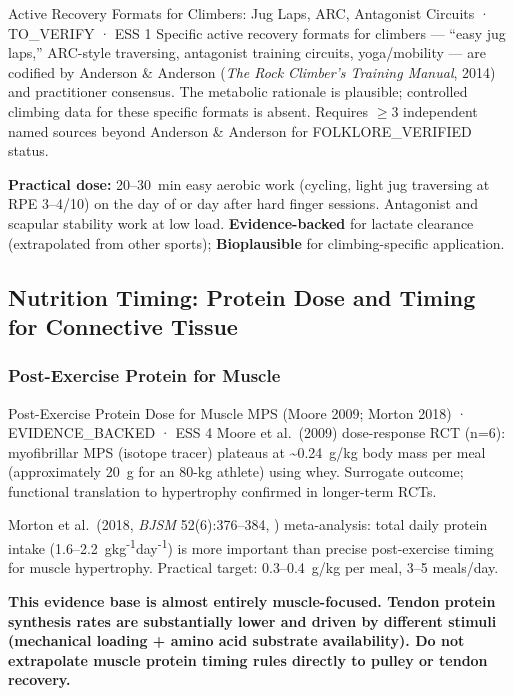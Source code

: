 \begin{toverifybox}{Active Recovery Formats for Climbers: Jug Laps, ARC, Antagonist Circuits · TO\_VERIFY · ESS 1}
Specific active recovery formats for climbers --- ``easy jug laps,'' ARC-style traversing, antagonist training circuits, yoga/mobility --- are codified by Anderson \& Anderson (\emph{The Rock Climber's Training Manual}, 2014) and practitioner consensus. The metabolic rationale is plausible; controlled climbing data for these specific formats is absent. Requires $\geq$3 independent named sources beyond Anderson \& Anderson for FOLKLORE\_VERIFIED status.
\end{toverifybox}

\textbf{Practical dose:} 20--30~min easy aerobic work (cycling, light jug traversing at RPE 3--4/10) on the day of or day after hard finger sessions. Antagonist and scapular stability work at low load. \textbf{Evidence-backed} for lactate clearance (extrapolated from other sports); \textbf{Bioplausible} for climbing-specific application.

\subsection{Nutrition Timing: Protein Dose and Timing for Connective Tissue}

\subsubsection*{Post-Exercise Protein for Muscle}

\begin{evidencebox}{Post-Exercise Protein Dose for Muscle MPS (Moore 2009; Morton 2018) · EVIDENCE\_BACKED · ESS 4}
Moore et al.\ (2009) dose-response RCT (n=6): myofibrillar MPS (isotope tracer) plateaus at \textasciitilde{}0.24~g/kg body mass per meal (approximately 20~g for an 80-kg athlete) using whey. Surrogate outcome; functional translation to hypertrophy confirmed in longer-term RCTs. \cite{MRFE09}

Morton et al.\ (2018, \emph{BJSM} 52(6):376--384, \cite{MMME17}) meta-analysis: total daily protein intake (1.6--2.2~g\textperiodcentered{}kg\textsuperscript{-1}\textperiodcentered{}day\textsuperscript{-1}) is more important than precise post-exercise timing for muscle hypertrophy. Practical target: 0.3--0.4~g/kg per meal, 3--5 meals/day.

\textbf{This evidence base is almost entirely muscle-focused. Tendon protein synthesis rates are substantially lower and driven by different stimuli (mechanical loading + amino acid substrate availability). Do not extrapolate muscle protein timing rules directly to pulley or tendon recovery.}
\end{evidencebox}

